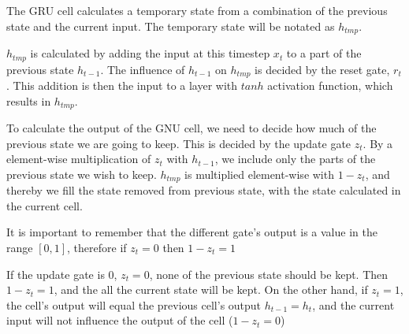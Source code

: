 The GRU cell calculates a temporary state from a combination of the previous state and the current input. The temporary state will be notated as $h_{tmp}$.

$h_{tmp}$ is calculated by adding the input at this timestep $x_t$ to a part of the previous state $h_{t-1}$. The influence of $h_{t-1}$ on $h_{tmp}$ is decided by the reset gate, $r_t$. This addition is then the input to a layer with $tanh$ activation function, which results in $h_{tmp}$.

To calculate the output of the GNU cell, we need to decide how much of the previous state we are going to keep. This is decided by the update gate $z_t$. By a element-wise multiplication of $z_t$ with $h_{t-1}$, we include only the parts of the previous state we wish to keep. $h_{tmp}$ is multiplied element-wise with $1 - z_t$, and thereby we fill the state removed from previous state, with the state calculated in the current cell.

It is important to remember that the different gate's output is a value in the range $[0, 1]$, therefore if $z_t = 0$ then $1 - z_t = 1$

If the update gate is 0, $z_t = 0$, none of the previous state should be kept. Then $1 - z_t = 1$, and the all the current state will be kept. On the other hand, if $z_t = 1$, the cell's output will equal the previous cell's output $h_{t-1} = h_t$, and the current input will not influence the output of the cell ($1 - z_t = 0$)  

